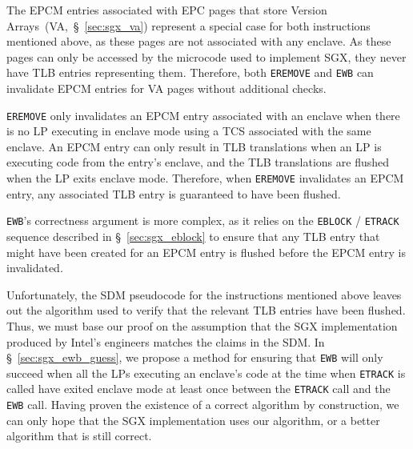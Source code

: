 The EPCM entries associated with EPC pages that store Version
Arrays~(VA,~\S~\ref{sec:sgx_va}) represent a special case for both instructions
mentioned above, as these pages are not associated with any enclave. As these
pages can only be accessed by the microcode used to implement SGX, they never
have TLB entries representing them. Therefore, both \texttt{EREMOVE} and
\texttt{EWB} can invalidate EPCM entries for VA pages without additional
checks.

\texttt{EREMOVE} only invalidates an EPCM entry associated with an enclave when
there is no LP executing in enclave mode using a TCS associated with the same
enclave. An EPCM entry can only result in TLB translations when an LP is
executing code from the entry's enclave, and the TLB translations are flushed
when the LP exits enclave mode. Therefore, when \texttt{EREMOVE} invalidates
an EPCM entry, any associated TLB entry is guaranteed to have been flushed.

\texttt{EWB}'s correctness argument is more complex, as it relies on the
\texttt{EBLOCK} / \texttt{ETRACK} sequence described in \S~\ref{sec:sgx_eblock}
to ensure that any TLB entry that might have been created for an EPCM entry is
flushed before the EPCM entry is invalidated.

Unfortunately, the SDM pseudocode for the instructions mentioned above leaves
out the algorithm used to verify that the relevant TLB entries have been
flushed. Thus, we must base our proof on the assumption that the SGX
implementation produced by Intel's engineers matches the claims in the SDM.
In \S~\ref{sec:sgx_ewb_guess}, we propose a method for ensuring that
\texttt{EWB} will only succeed when all the LPs executing an enclave's code at
the time when \texttt{ETRACK} is called have exited enclave mode at least once
between the \texttt{ETRACK} call and the \texttt{EWB} call. Having proven the
existence of a correct algorithm by construction, we can only hope that the SGX
implementation uses our algorithm, or a better algorithm that is still correct.

